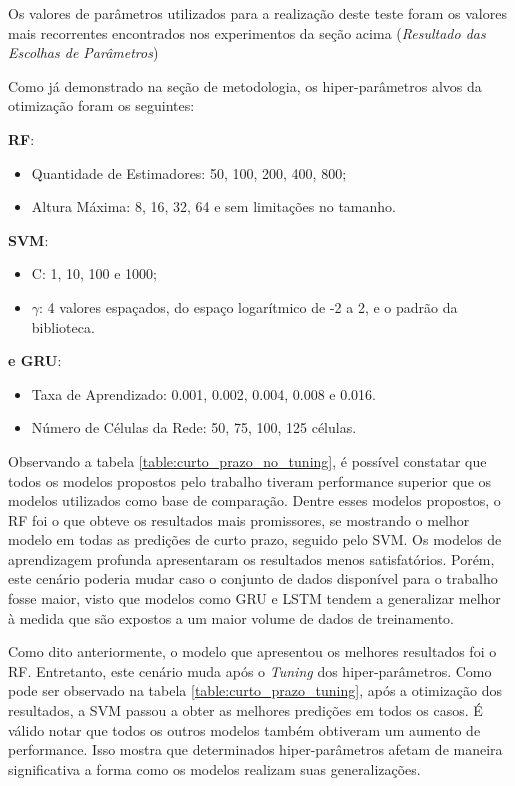  Os valores de parâmetros utilizados para a realização deste teste foram os valores mais recorrentes encontrados nos experimentos da seção acima (\textit{Resultado das Escolhas de Parâmetros})

 Como já demonstrado na seção de metodologia, os hiper-parâmetros alvos da otimização foram os seguintes:
 
 
\textbf{\acrshort{RF}}:
\begin{itemize}
    \item Quantidade de Estimadores: 50, 100, 200, 400, 800;
 \item Altura Máxima: 8, 16, 32, 64 e sem limitações no tamanho.
\end{itemize}

\textbf{\acrshort{SVM}}:
\begin{itemize}
    \item C: 1, 10, 100 e 1000;
    \item \textbf{\(\gamma\)}: 4 valores espaçados, do espaço logarítmico de -2 a 2, e o padrão da biblioteca.
\end{itemize}

\textbf{ e \acrshort{GRU}}:
\begin{itemize}
    \item Taxa de Aprendizado: 0.001, 0.002, 0.004, 0.008 e 0.016.
    \item Número de Células da Rede: 50, 75, 100, 125 células.
\end{itemize}

Observando a tabela \ref{table:curto_prazo_no_tuning}, é possível constatar que todos os modelos propostos pelo trabalho tiveram performance superior que os modelos utilizados como base de comparação. Dentre esses modelos propostos, o \acrlong{RF} foi o que obteve os resultados mais promissores, se mostrando o melhor modelo em todas as predições de curto prazo, seguido pelo \acrshort{SVM}. Os modelos de aprendizagem profunda apresentaram os resultados menos satisfatórios. Porém, este cenário poderia mudar caso o conjunto de dados disponível para o trabalho fosse maior, visto que modelos como \acrshort{GRU} e \acrshort{LSTM} tendem a generalizar melhor à medida que são expostos a um maior volume de dados de treinamento. 

Como dito anteriormente, o modelo que apresentou os melhores resultados foi o \acrshort{RF}. Entretanto, este cenário muda após o \textit{Tuning} dos hiper-parâmetros. Como pode ser observado na tabela \ref{table:curto_prazo_tuning}, após a otimização dos resultados, a \acrshort{SVM} passou a obter as melhores predições em todos os casos. É válido notar que todos os outros modelos também obtiveram um aumento de performance. Isso mostra que determinados hiper-parâmetros afetam de maneira significativa a forma como os modelos realizam suas generalizações.



